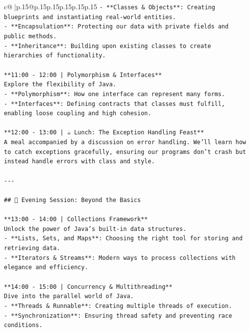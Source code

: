 \documentclass{article}
\begin{document}
{\begin{supertabular}{c@{$\;$}|p{.15\linewidth}@{}p{.15\linewidth}p{.15\linewidth}p{.15\linewidth}p{.15\linewidth}p{.15\linewidth}}
{{{\texttt{{-} **Classes \& Objects**: Creating blueprints and instantiating real{-}world entities.} \\
\texttt{{-} **Encapsulation**: Protecting our data with private fields and public methods.} \\
\texttt{{-} **Inheritance**: Building upon existing classes to create hierarchies of functionality.} \\
\\ 
\texttt{**11:00 {-} 12:00 | Polymorphism \& Interfaces**} \\
\texttt{Explore the flexibility of Java.} \\
\texttt{{-} **Polymorphism**: How one interface can represent many forms.} \\
\texttt{{-} **Interfaces**: Defining contracts that classes must fulfill, enabling loose coupling and high cohesion.} \\
\\ 
\texttt{**12:00 {-} 13:00 | ☕ Lunch: The Exception Handling Feast**} \\
\texttt{A meal accompanied by a discussion on error handling. We'll learn how to catch exceptions gracefully, ensuring our programs don't crash but instead handle errors with class and style.} \\
\\ 
\texttt{{-}{-}{-}} \\
\\ 
\texttt{\#\# 🌇 Evening Session: Beyond the Basics} \\
\\ 
\texttt{**13:00 {-} 14:00 | Collections Framework**} \\
\texttt{Unlock the power of Java's built{-}in data structures.} \\
\texttt{{-} **Lists, Sets, and Maps**: Choosing the right tool for storing and retrieving data.} \\
\texttt{{-} **Iterators \& Streams**: Modern ways to process collections with elegance and efficiency.} \\
\\ 
\texttt{**14:00 {-} 15:00 | Concurrency \& Multithreading**} \\
\texttt{Dive into the parallel world of Java.} \\
\texttt{{-} **Threads \& Runnable**: Creating multiple threads of execution.} \\
\texttt{{-} **Synchronization**: Ensuring thread safety and preventing race conditions.} \\
\\ 
}}}
\end{supertabular}}
\end{document}

